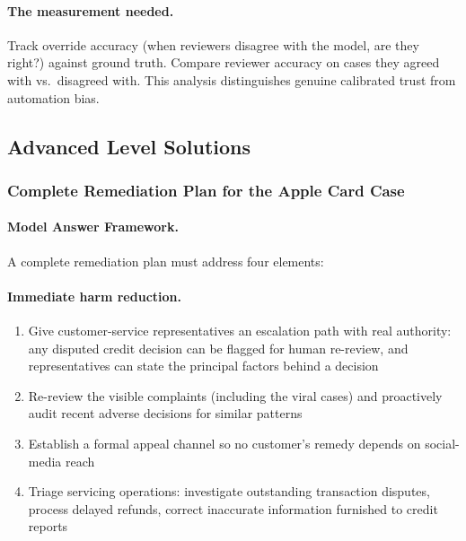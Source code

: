 \paragraph{The measurement needed.}

Track override accuracy (when reviewers disagree with the model, are they right?) against ground truth. Compare reviewer accuracy on cases they agreed with vs.\ disagreed with. This analysis distinguishes genuine calibrated trust from automation bias.

\subsection{Advanced Level Solutions}

\subsubsection{Complete Remediation Plan for the Apple Card Case}

\paragraph{Model Answer Framework.}

A complete remediation plan must address four elements:

\paragraph{Immediate harm reduction.}

\begin{enumerate}
    \item Give customer-service representatives an escalation path with real authority: any disputed credit decision can be flagged for human re-review, and representatives can state the principal factors behind a decision
    \item Re-review the visible complaints (including the viral cases) and proactively audit recent adverse decisions for similar patterns
    \item Establish a formal appeal channel so no customer's remedy depends on social-media reach
    \item Triage servicing operations: investigate outstanding transaction disputes, process delayed refunds, correct inaccurate information furnished to credit reports
\end{enumerate}

